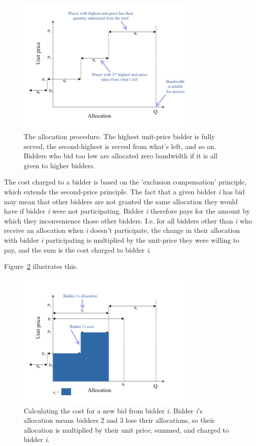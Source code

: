 \begin{figure}[h]
 \centering
   \includegraphics[width=0.8\textwidth]{allocation}
       \caption{The allocation procedure. The highest unit-price bidder is fully served, the second-highest is served from what's left, and so on. Bidders who bid too low are allocated zero bandwidth if it is all given to higher bidders.}
 \label{fig:allocation}
\end{figure}

The cost charged to a bidder is based on the 'exclusion compensation' principle, which extends the second-price principle. The fact that a given bidder {\it i} has bid may mean that other bidders are not granted the same allocation they would have if bidder {\it i} were not participating. Bidder {\it i} therefore pays for the amount by which they inconvenience those other bidders. I.e. for all bidders other than {\it i} who receive an allocation when {\it i} doesn't participate, the change in their allocation with bidder {\it i} participating is multiplied by the unit-price they were willing to pay, and the sum is the cost charged to bidder {\it i}.

Figure~\ref{fig:cost} illustrates this.

\begin{figure}[h]
 \centering
   \includegraphics[width=0.8\textwidth]{cost}
       \caption{Calculating the cost for a new bid from bidder {\it i}. Bidder {\it i}'s allocation means bidders 2 and 3 lose their allocations, so their allocation is multiplied by their unit price, summed, and charged to bidder {\it i}.}
 \label{fig:cost}
\end{figure}

